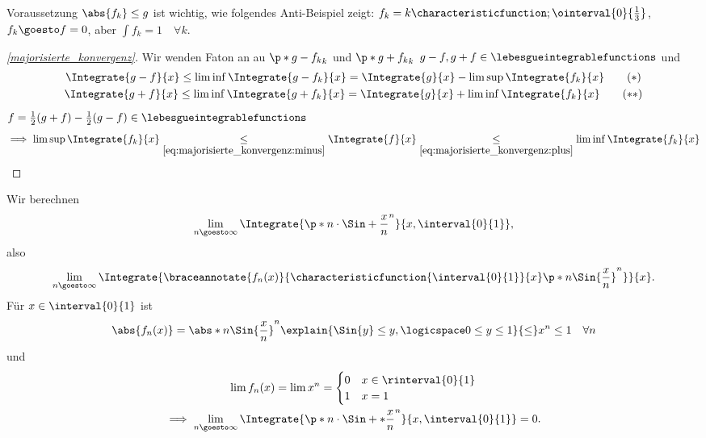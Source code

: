 \begin{bemerkung*}
  Voraussetzung \( \abs{f_k}\leq g \) ist wichtig, wie folgendes Anti-Beispiel zeigt: \( f_k=k \characteristicfunction;{\ointerval{0}{\frac{1}{3}}} \), \( f_k\goesto f=0 \), aber \( \int f_k=1\quad \forall k \).
\end{bemerkung*}
\begin{proof}[\ref{majorisierte_konvergenz}]
  Wir wenden Faton an au \( \p*{g-f_k}_k \) und \( \p*{g+f_k}_k \) \timplies \( g-f,g+f\in \lebesgueintegrablefunctions \) und 
  \begin{gather*}
    \Integrate{g-f}{x}\leq \liminf \Integrate{g-f_k}{x}=\Integrate{g}{x}-\limsup \Integrate{f_k}{x}\tag{\( * \)} \label{eq:majorisierte_konvergenz:minus}\\
    \Integrate{g+f}{x}\leq \liminf \Integrate{g+f_k}{x}=\Integrate{g}{x}+\liminf \Integrate{f_k}{x}\tag{\( ** \)} \label{eq:majorisierte_konvergenz:pus}
  \end{gather*}
  \( f=\frac{1}{2}(g+f)-\frac{1}{2}(g-f)\in \lebesgueintegrablefunctions \)
  \begin{equation*}
    \implies \limsup \Integrate{f_k}{x}\underset{\eqref{eq:majorisierte_konvergenz:minus}}{\leq}\Integrate{f}{x}\underset{\eqref{eq:majorisierte_konvergenz:plus}}{\leq}\liminf \Integrate{f_k}{x}
  \end{equation*}
\end{proof}
\begin{beispiel*}
  Wir berechnen
  \begin{equation*}
    \lim_{n \goesto \infty}\Integrate{\p*{n\cdot\Sin+{\frac{x}{n}}}^n}{x,\interval{0}{1}},
  \end{equation*}
  also
  \begin{equation*}
    \lim_{n \goesto \infty}\Integrate{\braceannotate{f_n(x)}{\characteristicfunction{\interval{0}{1}}{x}\p*{n\Sin{\frac{x}{n}}}^n}}{x}.
  \end{equation*}
  Für \( x\in \interval{0}{1} \) ist
  \begin{equation*}
    \abs{f_n(x)}=\abs*{n{\Sin{\frac{x}{n}}}}^n\explain{\Sin{y}\leq y,\logicspace 0\leq y\leq 1}{\leq}x^n\leq 1\quad \forall n
  \end{equation*}
  und
  \begin{gather*}
    \lim f_n(x)=\lim  x^n=\begin{cases}
      0 & x\in \rinterval{0}{1}\\
      1 & x=1
    \end{cases}\\
    \implies \lim_{n \goesto \infty}\Integrate{\p*{n\cdot\Sin+*{\frac{x}{n}}}^n}{x,\interval{0}{1}}=0.
  \end{gather*}
\end{beispiel*}


